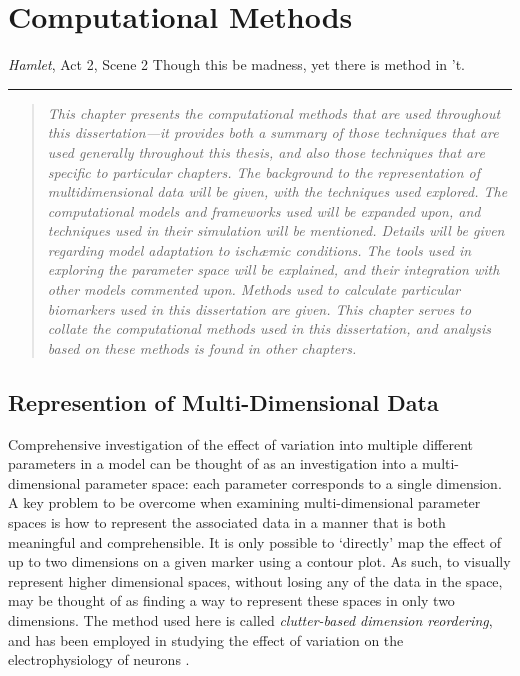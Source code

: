 \documentclass[../thesis-main.tex]{subfiles}
\begin{document}
\chapter{Computational Methods}
\label{ch:compMethods}

\begin{aquote}{\emph{Hamlet}, Act 2, Scene 2}
  {\selectfont
   Though this be madness, yet there is method in 't.
  }
\end{aquote}
\rule{\linewidth}{0.25mm}

\begin{quote}
 \emph{This chapter presents the computational methods that are used throughout this dissertation---it provides both a summary of those techniques that are used generally throughout this thesis, and also those techniques that are specific to particular chapters. The background to the representation of multidimensional data will be given, with the techniques used explored. The computational models and frameworks used will be expanded upon, and techniques used in their simulation  will be mentioned. Details will be given regarding model adaptation to isch\ae{}mic conditions. The tools used in exploring the parameter space will be explained, and their integration with other models commented upon. Methods used to calculate particular biomarkers used in this dissertation are given. This chapter serves to collate the computational methods used in this dissertation, and analysis based on these methods is found in other chapters.}
\end{quote}

\section{Represention of Multi-Dimensional Data}
\label{subsec:cbdr}
Comprehensive investigation of the effect of variation into multiple different parameters in a model can be thought of as an investigation into a multi-dimensional parameter space: each parameter corresponds to a single dimension. A key problem to be overcome when examining multi-dimensional parameter spaces is how to represent the associated data in a manner that is both meaningful and comprehensible. It is only possible to `directly' map the effect of up to two dimensions on a given marker using a contour plot. As such, to visually represent higher dimensional spaces, without losing any of the data in the space, may be thought of as finding a way to represent these spaces in only two dimensions. The method used here is called \emph{clutter-based dimension reordering}, and has been employed in studying the effect of variation on the electrophysiology of neurons \citep{LeBlanc1990, Peng2004, Peng2005, Taylor2006}.
\end{document}
